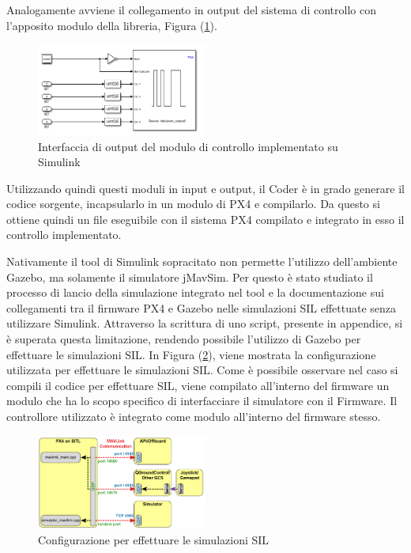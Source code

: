 Analogamente avviene il collegamento in output del sistema di controllo con l'apposito modulo della libreria, Figura (\ref{fig:out}).

\begin{figure}
	\centering
	\includegraphics[width=0.5\textwidth]{DescrizioneAutopilota/Figure/OUT}
	\caption{Interfaccia di output del modulo di controllo implementato su Simulink}
	\label{fig:out}
\end{figure}

Utilizzando quindi questi moduli in input e output, il Coder è in grado generare il codice sorgente, incapsularlo in un modulo di PX4 e compilarlo. Da questo si ottiene quindi un file eseguibile con il sistema PX4 compilato e integrato in esso il controllo implementato. 

Nativamente il tool di Simulink sopracitato non permette l'utilizzo dell'ambiente Gazebo, ma solamente il simulatore jMavSim. Per questo è stato studiato il processo di lancio della simulazione integrato nel tool e la documentazione sui collegamenti tra il firmware PX4 e Gazebo nelle simulazioni SIL effettuate senza utilizzare Simulink. Attraverso la scrittura di uno script, presente in appendice, si è superata questa limitazione, rendendo possibile l'utilizzo di Gazebo per effettuare le simulazioni SIL. In Figura (\ref{fig:ig:INTERSIL}), viene mostrata la configurazione utilizzata per effettuare le simulazioni SIL. Come è possibile osservare nel caso si compili il codice per effettuare SIL, viene compilato all'interno del firmware un modulo che ha lo scopo specifico di interfacciare il simulatore con il Firmware. Il controllore utilizzato è integrato come modulo all'interno del firmware stesso.

\begin{figure}[!h]
	\centering
	\includegraphics[width=0.5\textwidth]{DescrizioneAutopilota/Figure/INTERSIL}
	\caption{Configurazione per effettuare le simulazioni SIL}
	\label{fig:ig:INTERSIL}
\end{figure}


